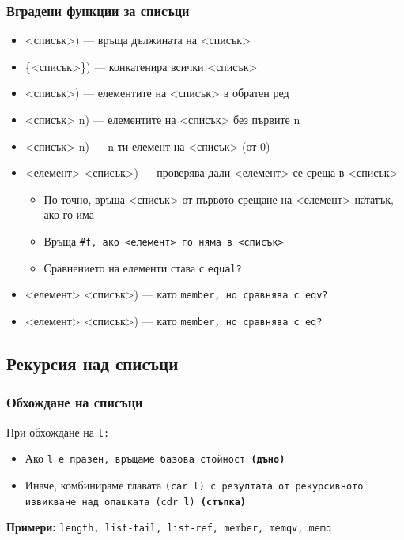 \documentclass[alsotrans,beameroptions={aspectratio=169}]{beamerswitch}
\begin{document}
\begin{frame}
  \frametitle{Вградени функции за списъци}
  \small
  \begin{itemize}[<+->]
  \item {} <списък>\tta) --- връща дължината на <списък>
  \item {} \{<списък>\}\tta) --- конкатенира всички <списък>
  \item {} <списък>\tta) --- елементите на <списък> в обратен ред
  \item {} <списък> n\tta) --- елементите на <списък> без първите n
  \item {} <списък> n\tta) --- n-ти елемент на <списък> (от 0)
  \item {} <елемент> <списък>\tta) --- проверява дали <елемент> се среща в <списък>
    \begin{itemize}
    \item По-точно, връща <списък> от първото срещане на <елемент> нататък, ако го има
    \item Връща \tt{\#f}, ако <елемент> го няма в <списък>
    \item Сравнението на елементи става с \tt{equal?}
    \end{itemize}
  \item {} <елемент> <списък>\tta) --- като \tt{member}, но сравнява с \tt{eqv?}
  \item {} <елемент> <списък>\tta) --- като \tt{member}, но сравнява с \tt{eq?}
  \end{itemize}
\end{frame}

\subsection{Рекурсия над списъци}

\begin{frame}
  \frametitle{Обхождане на списъци}

  При обхождане на \tt l:
  \begin{itemize}
  \item Ако \tt l е празен, връщаме базова стойност \textbf{(дъно)}
  \item Иначе, комбинираме главата \tt{(car l)} с резултата от рекурсивното извикване над опашката \tt{(cdr l)} \textbf{(стъпка)}
  \end{itemize}
  \pause
  \vspace{4ex}
  \textbf{Примери:} \tt{length}, \tt{list-tail}, \tt{list-ref}, \tt{member}, \tt{memqv}, \tt{memq}
\end{frame}
\end{document}
